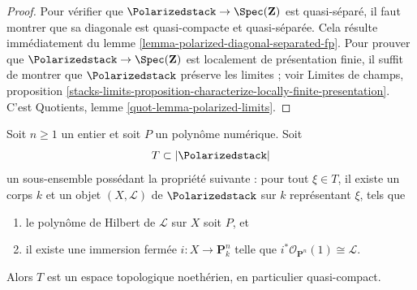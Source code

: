 \begin{proof}
Pour vérifier que $\Polarizedstack \to \Spec(\mathbf{Z})$ est
quasi-séparé, il faut montrer que sa diagonale est quasi-compacte et
quasi-séparée. Cela résulte immédiatement du lemme
\ref{lemma-polarized-diagonal-separated-fp}.
Pour prouver que $\Polarizedstack \to \Spec(\mathbf{Z})$ est localement de
présentation finie, il suffit de montrer que $\Polarizedstack$ préserve les
limites ; voir Limites de champs, proposition
\ref{stacks-limits-proposition-characterize-locally-finite-presentation}.
C'est Quotients, lemme \ref{quot-lemma-polarized-limits}.
\end{proof}

\begin{lemma}
\label{lemma-bounded-polarized}
Soit $n \geq 1$ un entier et soit $P$ un polynôme numérique.
Soit
$$
T \subset |\Polarizedstack|
$$
un sous-ensemble possédant la propriété suivante : pour tout $\xi \in T$,
il existe un corps $k$ et un objet $(X, \mathcal{L})$ de
$\Polarizedstack$ sur $k$ représentant $\xi$, tels que
\begin{enumerate}
\item le polynôme de Hilbert de $\mathcal{L}$ sur $X$ soit $P$, et
\item il existe une immersion fermée $i : X \to \mathbf{P}^n_k$ telle que
$i^*\mathcal{O}_{\mathbf{P}^n}(1) \cong \mathcal{L}$.
\end{enumerate}
Alors $T$ est un espace topologique noethérien, en particulier
quasi-compact.
\end{lemma}

